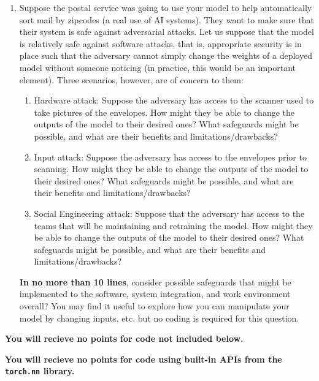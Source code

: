 \documentclass[submit]{../harvardml}
\begin{document}
\begin{problem}
\begin{enumerate}
  \item Suppose the postal service was going to use your model to help automatically sort mail by zipcodes (a real use of AI systems).  They want to make sure that their system is safe against adversarial attacks.  Let us suppose that the model is relatively safe against software attacks, that is, appropriate security is in place such that the adversary cannot simply change the weights of a deployed model without someone noticing (in practice, this would be an important element).  Three scenarios, however, are of concern to them:
        \begin{enumerate}
          \item Hardware attack: Suppose the adversary has access to the
                scanner used to take pictures of the envelopes.  How might
                they be able to change the outputs of the model to their
                desired ones?  What safeguards might be possible, and what
                are their benefits and limitations/drawbacks?
          \item Input attack: Suppose the adversary has access to the
                envelopes prior to scanning.  How might they be able to
                change the outputs of the model to their desired ones?
                What safeguards might be possible, and what are their
                benefits and limitations/drawbacks?
          \item Social Engineering attack: Suppose that the adversary
                has access to the teams that will be maintaining and
                retraining the model.  How might they be able to change the
                outputs of the model to their desired ones?  What safeguards
                might be possible, and what are their benefits and
                limitations/drawbacks?
        \end{enumerate}
        \textbf{In no more than 10 lines}, consider possible safeguards that might be implemented to the software, system integration, and work environment overall?  You may find
        it useful to explore how you can manipulate your model by
        changing inputs, etc. but no coding is required for this
        question.

\end{enumerate}

{\bfseries You will recieve no points for code not included below.}

{\bfseries You will recieve no points for code using built-in APIs from the \verb|torch.nn| library.}

\end{problem}
\end{document}
